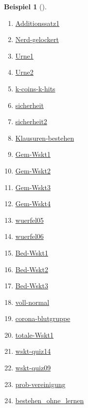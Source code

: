 \documentclass[
  ngerman,
  letterpaper,
  twoside,
  open=any]{scrbook}
\providecommand{\tightlist}{%
  \setlength{\itemsep}{0pt}\setlength{\parskip}{0pt}}\usepackage{longtable,booktabs,array}
\theoremstyle{definition}
\newtheorem{example}{Beispiel}[chapter]
\theoremstyle{plain}
\theoremstyle{definition}
\theoremstyle{definition}
\theoremstyle{remark}
\begin{document}
\begin{example}[]
\begin{enumerate}
\def\labelenumi{\arabic{enumi}.}
\tightlist
\item
  \href{https://datenwerk.netlify.app/posts/additionssatz1/additionssatz1.html}{Additionssatz1}
\item
  \href{https://datenwerk.netlify.app/posts/nerd-gelockert/nerd-gelockert.html}{Nerd-gelockert}
\item
  \href{https://datenwerk.netlify.app/posts/urne1/urne1.html}{Urne1}
\item
  \href{https://datenwerk.netlify.app/posts/urne2/urne2.html}{Urne2}
\item
  \href{https://datenwerk.netlify.app/posts/k-coins-k-hits/k-coins-k-hits.html}{k-coins-k-hits}
\item
  \href{https://datenwerk.netlify.app/posts/sicherheit/sicherheit.html}{sicherheit}
\item
  \href{https://datenwerk.netlify.app/posts/sicherheit2/sicherheit2.html}{sicherheit2}
\item
  \href{https://datenwerk.netlify.app/posts/klausuren-bestehen/klausuren-bestehen.html}{Klausuren-bestehen}
\item
  \href{https://datenwerk.netlify.app/posts/gem-wskt1/gem-wskt1.html}{Gem-Wskt1}
\item
  \href{https://datenwerk.netlify.app/posts/gem-wskt2/gem-wskt2.html}{Gem-Wskt2}
\item
  \href{https://datenwerk.netlify.app/posts/gem-wskt3/gem-wskt3.html}{Gem-Wskt3}
\item
  \href{https://datenwerk.netlify.app/posts/gem-wskt4}{Gem-Wskt4}
\item
  \href{https://datenwerk.netlify.app/posts/wuerfel05/wuerfel05}{wuerfel05}
\item
  \href{https://datenwerk.netlify.app/posts/wuerfel06/wuerfel06}{wuerfel06}
\item
  \href{https://datenwerk.netlify.app/posts/bed-wskt1/bed-wskt1.html}{Bed-Wskt1}
\item
  \href{https://datenwerk.netlify.app/posts/bed-wskt2/bed-wskt2.html}{Bed-Wskt2}
\item
  \href{https://datenwerk.netlify.app/posts/bed-wskt3/bed-wskt3.html}{Bed-Wskt3}
\item
  \href{https://datenwerk.netlify.app/posts/voll-normal}{voll-normal}
\item
  \href{https://datenwerk.netlify.app/posts/corona-blutgruppe/corona-blutgruppe.html}{corona-blutgruppe}
\item
  \href{https://datenwerk.netlify.app/posts/totale-wskt1/totale-wskt1.html}{totale-Wskt1}
\item
  \href{https://datenwerk.netlify.app/posts/wskt-quiz14/wskt-quiz14.html}{wskt-quiz14}
\item
  \href{https://datenwerk.netlify.app/posts/wskt-quiz09/wskt-quiz09.html}{wskt-quiz09}
\item
  \href{https://sebastiansauer.github.io/datenwerk/posts/prob-vereinigung/}{prob-vereinigung}
\item
  \href{https://datenwerk.netlify.app/posts/bestehen_ohne_lernen/}{bestehen\_ohne\_lernen}
\end{enumerate}


\end{example}
\end{document}
